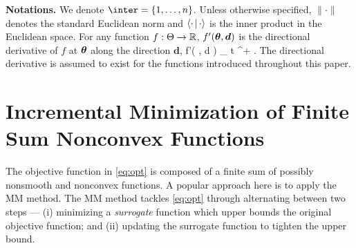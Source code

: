 \documentclass[11pt]{article}
\theoremstyle{t}
\begin{document}
\textbf{Notations.}
We denote $\inter=\{1,\dots,n\}$. Unless otherwise specified,  $\| \cdot \|$ denotes the standard Euclidean norm and $\pscal{ \cdot }{\cdot }$ is the inner product in the Euclidean space.
For any function $f : \Param \rightarrow \rset$,  $f'( \param, {\bm d} )$ is the directional derivative of $f$ at $\param$ along the direction ${\bm d}$, \ie
\beq
f'( \param, {\bm d} ) \eqdef \lim_{ t ^+ }  \eqsp.
\eeq
The directional derivative is assumed to exist for the functions introduced throughout this paper.


\vspace{-0.05in}
\section{Incremental Minimization of Finite Sum Nonconvex Functions}\label{sec:framework}
\vspace{-0.05in}

The objective function in \eqref{eq:opt} is composed of a finite sum of possibly nonsmooth and nonconvex functions.
A popular approach here is to apply the MM method. The MM method tackles \eqref{eq:opt} through alternating between two steps --- {\sf (i)} minimizing a  \emph{surrogate} function which upper bounds the original objective function; and {\sf (ii)} updating the surrogate function to tighten the upper bound.
\end{document}
